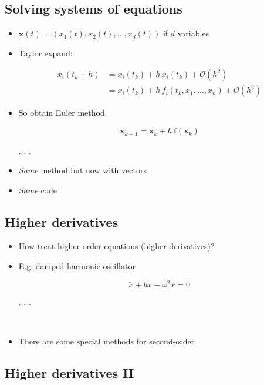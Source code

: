 \documentclass[
]{article}
\begin{document}
\hypertarget{solving-systems-of-equations}{%
\subsection{Solving systems of
equations}\label{solving-systems-of-equations}}

\begin{itemize}
\item
  \(\mathbf{x}(t) = (x_1(t), x_2(t), \ldots, x_d(t))\) if \(d\)
  variables
\item
  Taylor expand:

  \begin{align*}
    x_i(t_k + h) &= x_i(t_k) + h \, \dot{x_i}(t_k) + \mathcal{O}(h^2) \\
      &= x_i(t_k) + h \, f_i(t_k, x_1, \ldots, x_n) + \mathcal{O}(h^2)
     \end{align*}
\item
  So obtain Euler method

  \[\mathbf{x}_{k+1} = \mathbf{x}_k + h \, \mathbf{f}(\mathbf{x}_k)\]

  . . .
\item
  \emph{Same} method but now with vectors
\item
  \emph{Same} code
\end{itemize}

\hypertarget{higher-derivatives}{%
\subsection{Higher derivatives}\label{higher-derivatives}}

\begin{itemize}
\item
  How treat higher-order equations (higher derivatives)?
\item
  E.g. damped harmonic oscillator

  \[\ddot{x} + b \dot{x} + \omega^2 x = 0\]

  . . .

  ~\\
\item
  There are some special methods for second-order
\end{itemize}

\hypertarget{higher-derivatives-ii}{%
\subsection{Higher derivatives II}\label{higher-derivatives-ii}}
\end{document}
